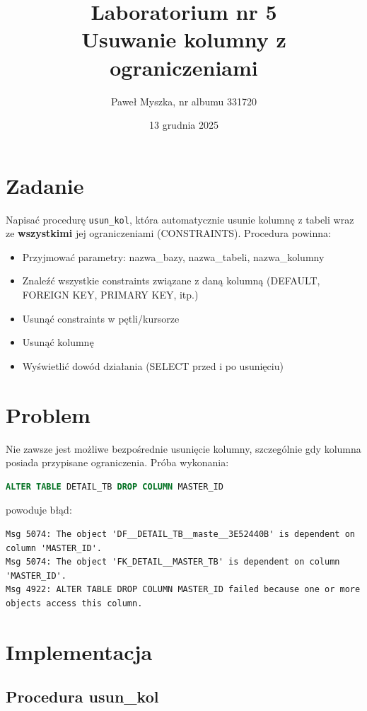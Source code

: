 \documentclass[a4paper,11pt]{article}
\title{Laboratorium nr 5\\
	\large Usuwanie kolumny z ograniczeniami}
\author{Paweł Myszka, nr albumu 331720}
\date{13 grudnia 2025}
\begin{document}
	
	\maketitle
	
	\section{Zadanie}
	
	Napisać procedurę \texttt{usun\_kol}, która automatycznie usunie kolumnę z tabeli wraz ze \textbf{wszystkimi} jej ograniczeniami (CONSTRAINTS). Procedura powinna:
	\begin{itemize}
		\item Przyjmować parametry: nazwa\_bazy, nazwa\_tabeli, nazwa\_kolumny
		\item Znaleźć wszystkie constraints związane z daną kolumną (DEFAULT, FOREIGN KEY, PRIMARY KEY, itp.)
		\item Usunąć constraints w pętli/kursorze
		\item Usunąć kolumnę
		\item Wyświetlić dowód działania (SELECT przed i po usunięciu)
	\end{itemize}

	\section{Problem}
	
	Nie zawsze jest możliwe bezpośrednie usunięcie kolumny, szczególnie gdy kolumna posiada przypisane ograniczenia. Próba wykonania:
	
	\begin{lstlisting}[language=SQL]
ALTER TABLE DETAIL_TB DROP COLUMN MASTER_ID
	\end{lstlisting}
	
	powoduje błąd:
	\begin{lstlisting}
Msg 5074: The object 'DF__DETAIL_TB__maste__3E52440B' is dependent on column 'MASTER_ID'.
Msg 5074: The object 'FK_DETAIL__MASTER_TB' is dependent on column 'MASTER_ID'.
Msg 4922: ALTER TABLE DROP COLUMN MASTER_ID failed because one or more objects access this column.
	\end{lstlisting}
	
	\section{Implementacja}
	
	\subsection{Procedura usun\_kol}
	
\end{document}
